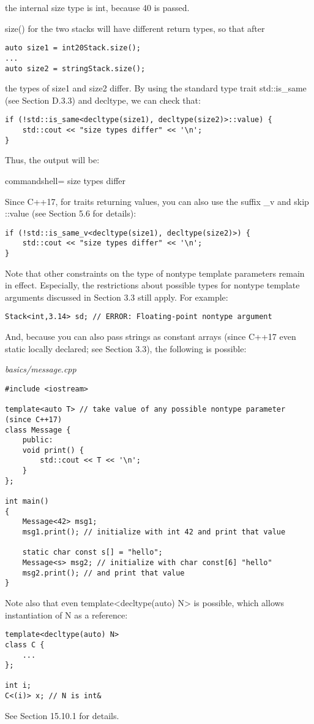 the internal size type is int, because 40 is passed.

size() for the two stacks will have different return types, so that after

\begin{lstlisting}[style=styleCXX]
auto size1 = int20Stack.size();
...
auto size2 = stringStack.size();
\end{lstlisting}

the types of size1 and size2 differ. By using the standard type trait std::is\_same (see Section D.3.3) and decltype, we can check that:

\begin{lstlisting}[style=styleCXX]
if (!std::is_same<decltype(size1), decltype(size2)>::value) {
	std::cout << "size types differ" << '\n';
}
\end{lstlisting}

Thus, the output will be:

\begin{tcblisting}{commandshell={}}
size types differ
\end{tcblisting}

Since C++17, for traits returning values, you can also use the suffix \_v and skip ::value (see Section 5.6 for details):

\begin{lstlisting}[style=styleCXX]
if (!std::is_same_v<decltype(size1), decltype(size2)>) {
	std::cout << "size types differ" << '\n';
}
\end{lstlisting}

Note that other constraints on the type of nontype template parameters remain in effect. Especially, the restrictions about possible types for nontype template arguments discussed in Section 3.3 still apply. For example:

\begin{lstlisting}[style=styleCXX]
Stack<int,3.14> sd; // ERROR: Floating-point nontype argument
\end{lstlisting}

And, because you can also pass strings as constant arrays (since C++17 even static locally declared; see Section 3.3), the following is possible:

\noindent
\textit{basics/message.cpp}
\begin{lstlisting}[style=styleCXX]
#include <iostream>

template<auto T> // take value of any possible nontype parameter (since C++17)
class Message {
	public:
	void print() {
		std::cout << T << '\n';
	}
};

int main()
{
	Message<42> msg1;
	msg1.print(); // initialize with int 42 and print that value
	
	static char const s[] = "hello";
	Message<s> msg2; // initialize with char const[6] "hello"
	msg2.print(); // and print that value
}
\end{lstlisting}

Note also that even template<decltype(auto) N> is possible, which allows instantiation of N as a reference:

\begin{lstlisting}[style=styleCXX]
template<decltype(auto) N>
class C {
	...
};

int i;
C<(i)> x; // N is int&
\end{lstlisting}

See Section 15.10.1 for details.




